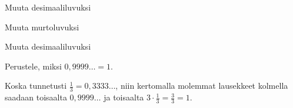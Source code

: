 \begin{tehtavasivu}
\begin{tehtava}
Muuta desimaaliluvuksi
\begin{vastaus}
\end{vastaus}
\end{tehtava}

\begin{tehtava}
Muuta murtoluvuksi
\begin{vastaus}
\end{vastaus}
\end{tehtava}

\begin{tehtava}
Muuta desimaaliluvuksi
\begin{vastaus}
\end{vastaus}
\end{tehtava}

\begin{tehtava}
Perustele, miksi $0,9999\ldots=1$.
	\begin{vastaus}
	Koska tunnetusti $\frac{1}{3}=0,3333\ldots$, niin kertomalla molemmat lausekkeet kolmella saadaan toisaalta $0,9999\ldots$ ja toisaalta $3\cdot \frac{1}{3}=\frac{3}{3}=1$.
	\end{vastaus}
\end{tehtava}



\end{tehtavasivu}
